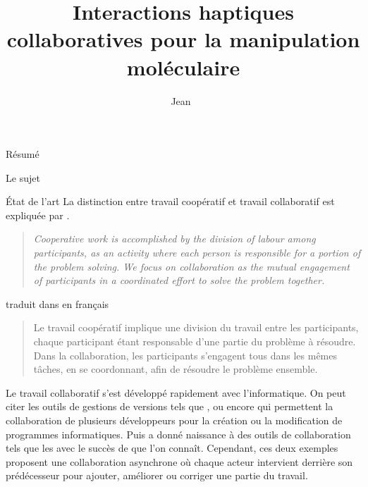 \documentclass[myfrancais]{mythesis}
\title{Interactions haptiques collaboratives pour la manipulation moléculaire}
\author{Jean~\myname{Simard}}
\date{\mydate[datestyle=long]{01/12/2011}}
\begin{document}
	\frontmatter
	\maketitle
	\mytoc
	\mylof
	\mylot
	\begin{mychapter+}{Résumé}
		\par
		\par
		\par
		\par
		\par
		\par
	\end{mychapter+}
	\mainmatter
	\begin{mychapter}{Le sujet}
		\begin{mysection}{État de l'art}
			La distinction entre travail coopératif et travail collaboratif est expliquée par .
			\begin{quote}
				\it Cooperative work is accomplished by the division of labour among participants, as an activity where each person is responsible for a portion of the problem solving.
				We focus on collaboration as the mutual engagement of participants in a coordinated effort to solve the problem together.
			\end{quote}
			traduit dans  en français
			\begin{quote}
				Le travail coopératif implique une division du travail entre les participants, chaque participant étant responsable d’une partie du problème à résoudre.
				Dans la collaboration, les participants s’engagent tous dans les mêmes tâches, en se coordonnant, afin de résoudre le problème ensemble.
			\end{quote}
			Le travail collaboratif s'est développé rapidement avec l'informatique.
			On peut citer les outils de gestions de versions tels que ,  ou encore  qui permettent la collaboration de plusieurs développeurs pour la création ou la modification de programmes informatiques.
			Puis \myInternet a donné naissance à des outils de collaboration tels que les \myWiki* {} avec le succès de \myWikipedia que l'on connaît.
			Cependant, ces deux exemples proposent une collaboration asynchrone où chaque acteur intervient derrière son prédécesseur pour ajouter, améliorer ou corriger une partie du travail.

\end{mysection}
\end{mychapter}
\end{document}
